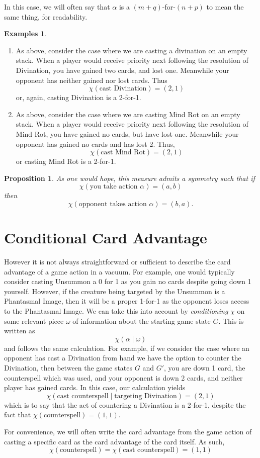 \documentclass[1pt]{report}
\newtheorem{prop}[thm]{Proposition}
\newtheorem{egs}[thm]{Examples}
\newcommand{\<}{\langle}
\renewcommand{\>}{\rangle}
\begin{document}
\begin{rmkbox}
In this case, we will often say that $\alpha$ is a $(m+q)$-for-$(n+p)$ to mean the same thing, for readability.
\end{rmkbox}
\begin{egs}
\end{egs}
\begin{enumerate}
\item As above, consider the case where we are casting a divination on an empty stack. When a player would receive priority next following the resolution of Divination, you have gained two cards, and lost one. Meanwhile your opponent has neither gained nor lost cards. Thus 
$$\chi(\text{cast Divination}) = (2,1)$$
or, again, casting Divination is a 2-for-1.
\item As above, consider the case where we are casting Mind Rot on an empty stack. When a player would receive priority next following the resolution of Mind Rot, you have gained no cards, but have lost one. Meanwhile your opponent has gained no cards and has lost 2. Thus,
$$\chi(\text{cast Mind Rot}) = (2,1)$$
or casting Mind Rot is a 2-for-1.
\end{enumerate}
\begin{prop}
As one would hope, this measure admits a symmetry such that if
$$\chi(\text{you take action }\alpha) = (a,b)$$
then
$$\chi(\text{opponent takes action }\alpha) = (b,a).$$
\end{prop}
\section{Conditional Card Advantage}
However it is not always straightforward or sufficient to describe the card advantage of a game action in a vacuum. For example, one would typically consider casting Unsummon a 0 for 1 as you gain no cards despite going down 1 yourself. However, if the creature being targeted by the Unsummon is a Phantasmal Image, then it will be a proper 1-for-1 as the opponent loses access to the Phantasmal Image. We can take this into account by \emph{conditioning} $\chi$ on some relevant piece $\omega$ of information about the starting game state $G$. This is written as
$$\chi(\alpha \mid \omega)$$
and follows the same calculation. For example, if we consider the case where an opponent has cast a Divination from hand we have the option to counter the Divination, then between the game states $G$ and $G'$, you are down 1 card, the counterspell which was used, and your opponent is down 2 cards, and neither player has gained cards. In this case, our calculation yields
$$\chi(\text{cast counterspell} \mid \text{targeting Divination}) = (2, 1)$$
which is to say that the act of countering a Divination is a 2-for-1, despite the fact that $\chi(\text{counterspell}) = (1,1)$.
\begin{rmkbox}
For convenience, we will often write the card advantage from the game action of casting a specific card as the card advantage of the card itself. As such,
$$\chi(\text{counterspell}) = \chi(\text{cast counterspell}) = (1,1)$$
\end{rmkbox}
\end{document}
